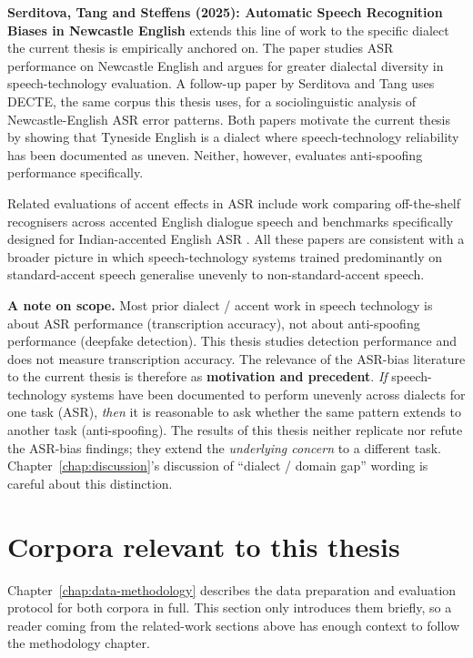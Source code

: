 \textbf{Serditova, Tang and Steffens (2025): Automatic Speech
Recognition Biases in Newcastle English}
\cite{Serditova2025_NewcastleASR} extends this line of work to the
specific dialect the current thesis is empirically anchored on.
The paper studies ASR performance on Newcastle English and argues
for greater dialectal diversity in speech-technology evaluation.
A follow-up paper by Serditova and Tang
\cite{SerditovaTang2026_NewcastleASR} uses DECTE, the same corpus
this thesis uses, for a sociolinguistic analysis of
Newcastle-English ASR error patterns. Both papers motivate the
current thesis by showing that Tyneside English is a dialect
where speech-technology reliability has been documented as
uneven. Neither, however, evaluates anti-spoofing performance
specifically.

Related evaluations of accent effects in ASR include work
comparing off-the-shelf recognisers across accented English
dialogue speech \cite{Aksenova2022_AccentASR} and benchmarks
specifically designed for Indian-accented English ASR
\cite{Javed2023_Svarah}. All these papers are consistent with a
broader picture in which speech-technology systems trained
predominantly on standard-accent speech generalise unevenly to
non-standard-accent speech.

\textbf{A note on scope.} Most prior dialect / accent work in
speech technology is about ASR performance (transcription
accuracy), not about anti-spoofing performance (deepfake
detection). This thesis studies detection performance and does
not measure transcription accuracy. The relevance of the ASR-bias
literature to the current thesis is therefore as
\textbf{motivation and precedent}. \emph{If} speech-technology
systems have been documented to perform unevenly across dialects
for one task (ASR), \emph{then} it is reasonable to ask whether
the same pattern extends to another task (anti-spoofing). The
results of this thesis neither replicate nor refute the ASR-bias
findings; they extend the \emph{underlying concern} to a
different task. Chapter~\ref{chap:discussion}'s discussion of
``dialect / domain gap'' wording is careful about this
distinction.


\section{Corpora relevant to this thesis}
\label{sec:background-corpora}

Chapter~\ref{chap:data-methodology} describes the data preparation
and evaluation protocol for both corpora in full. This section
only introduces them briefly, so a reader coming from the
related-work sections above has enough context to follow the
methodology chapter.

